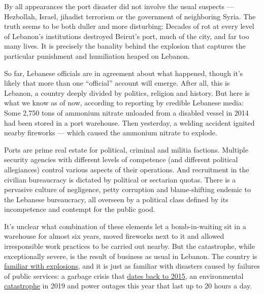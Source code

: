 By all appearances the port disaster did not involve the usual suspects
--- Hezbollah, Israel, jihadist terrorism or the government of
neighboring Syria. The truth seems to be both duller and more
disturbing: Decades of rot at every level of Lebanon's institutions
destroyed Beirut's port, much of the city, and far too many lives. It is
precisely the banality behind the explosion that captures the particular
punishment and humiliation heaped on Lebanon.

So far, Lebanese officials are in agreement about what happened, though
it's likely that more than one ``official'' account will emerge. After
all, this is Lebanon, a country deeply divided by politics, religion and
history. But here is what we know as of now, according to reporting by
credible Lebanese media: Some 2,750 tons of ammonium nitrate unloaded
from a disabled vessel in 2014 had been stored in a port warehouse. Then
yesterday, a welding accident ignited nearby fireworks --- which caused
the ammonium nitrate to explode.

Ports are prime real estate for political, criminal and militia
factions. Multiple security agencies with different levels of competence
(and different political allegiances) control various aspects of their
operations. And recruitment in the civilian bureaucracy is dictated by
political or sectarian quotas. There is a pervasive culture of
negligence, petty corruption and blame-shifting endemic to the Lebanese
bureaucracy, all overseen by a political class defined by its
incompetence and contempt for the public good.

It's unclear what combination of these elements let a bomb-in-waiting
sit in a warehouse for almost six years, moved fireworks next to it and
allowed irresponsible work practices to be carried out nearby. But the
catastrophe, while exceptionally severe, is the result of business as
usual in Lebanon. The country is
\href{https://www.nytimes.com/reuters/2020/08/04/world/middleeast/04reuters-lebanon-security-blast-timeline.html}{familiar
with explosions}, and it is just as familiar with disasters caused by
failures of public services: a garbage crisis that
\href{https://www.nytimes.com/2015/07/28/world/middleeast/lebanese-seethe-stinking-garbage-piles-grow-beirut.html}{dates
back to 2015}, an environmental
\href{https://www.nytimes.com/2019/10/19/opinion/international-world/lebanon-is-on-fire.html}{catastrophe}
in 2019 and power outages this year that last up to 20 hours a day.

